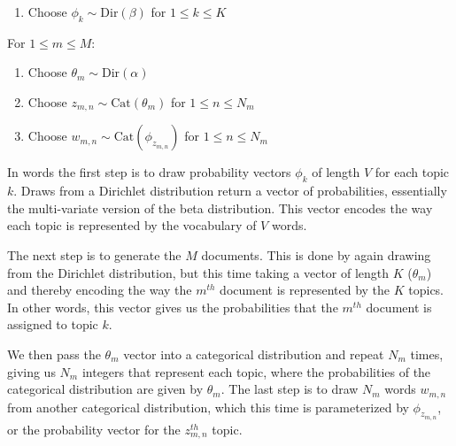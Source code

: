 \begin{enumerate}
\item Choose $\phi_k \sim  \text{Dir}(\beta)$ for $1 \leq k \leq K$
\end{enumerate}
For $1 \leq m \leq M$:
\begin{enumerate}
\item Choose $\theta_m \sim \text{Dir}(\alpha)$
\item Choose $z_{m,n} \sim  \text{Cat}(\theta_m)$ for $1 \leq n \leq N_m$
\item Choose $w_{m,n} \sim  \text{Cat}(\phi_{z_{m,n}})$ for $1 \leq n \leq N_m$
\end{enumerate}
\noindent In words the first step is to draw probability vectors $\phi_k$ of length $V$ for each topic $k$. Draws from a Dirichlet distribution return a vector of probabilities, essentially the multi-variate version of the beta distribution. This vector encodes the way each topic is represented by the vocabulary of $V$ words.

The next step is to generate the $M$ documents. This is done by again drawing from the Dirichlet distribution, but this time taking a vector of length $K$ ($\theta_m$) and thereby encoding the way the $m^{th}$ document is represented by the $K$ topics. In other words, this vector gives us the probabilities that the $m^{th}$ document is assigned to topic $k$. 

We then pass the $\theta_m$ vector into a categorical distribution and repeat $N_m$ times, giving us $N_m$ integers that represent each topic, where the probabilities of the categorical distribution are given by $\theta_m$. The last step is to draw $N_m$ words $w_{m,n}$ from another categorical distribution, which this time is parameterized by $\phi_{z_{m,n}}$, or the probability vector for the $z_{m,n}^{th}$ topic.
